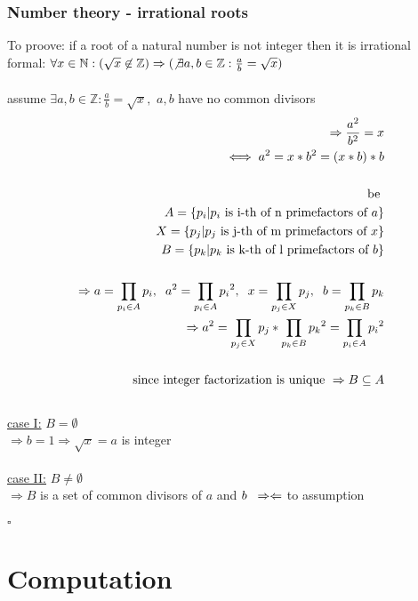 \documentclass[a4paper]{article}
\newcommand{\spc}{\hspace{0.2cm}}
\newcommand{\follows}{\Rightarrow}
\newcommand{\contra}{\Rightarrow\Leftarrow}
\begin{document}
\section{Number theory - irrational roots}
To proove: if a root of a natural number is not integer then it is irrational\\
formal: $\forall x\in\mathbb{N}: (\sqrt{x}\not\in\mathbb{Z}) \follows (\not\exists a,b\in\mathbb{Z}: \frac{a}{b}=\sqrt{x})$
\\\\
assume $\exists a,b\in\mathbb{Z}:\frac{a}{b}=\sqrt{x},$ $a,b$ have no common divisors\\
\begin{align*}
  \follows \frac{a^2}{b^2}=x\\
  \iff a^2=x*b^2=(x*b)*b\\\\
  \text{be }\\
  A=\{p_i|p_i \text{ is i-th of n primefactors of }a\}\\
  X=\{p_j|p_j \text{ is j-th of m primefactors of }x\}\\
  B=\{p_k|p_k \text{ is k-th of l primefactors of }b\}\\\\
  \follows a=\prod_{p_i\in A}{p_i},\spc a^2=\prod_{p_i\in A}{p_i}^2,\spc x=\prod_{p_j\in X}{p_j},\spc b=\prod_{p_k\in B}{p_k}\\
  \follows a^2=\prod_{p_j\in X}{p_j}*\prod_{p_k\in B}{p_k}^2=\prod_{p_i\in A}{p_i}^2\\\\
  \text{since integer factorization is unique }\follows B\subseteq A\\ 
\end{align*}\\
\underline{case I:} $B=\emptyset$\\
$\follows b=1\follows \sqrt{x}=a$ is integer
\\\\
\underline{case II:} $B\not=\emptyset$\\
$\follows B$ is a set of common divisors of $a$ and $b\spc\contra$ to assumption
\\\\
$\square$
\newpage
\part{Computation}
\end{document}
